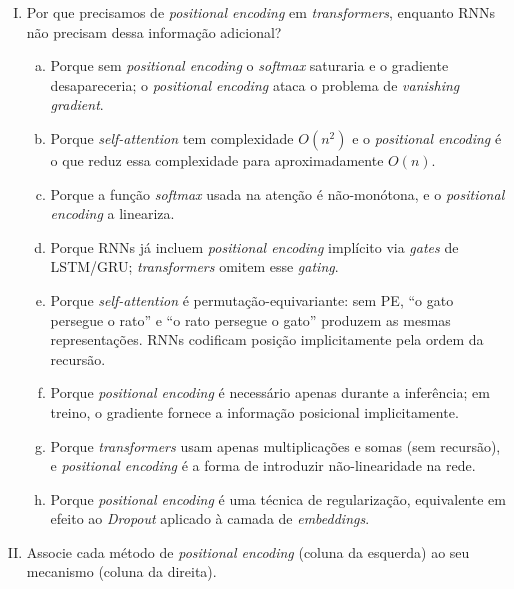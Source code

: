 \documentclass{dlproblemset}
\begin{document}
\begin{enumerate}[I)]
\item Por que precisamos de \textit{positional encoding} em \textit{transformers}, enquanto RNNs não precisam dessa informação adicional?

\begin{enumerate}[a)]
    \item Porque sem \textit{positional encoding} o \textit{softmax} saturaria e o gradiente desapareceria; o \textit{positional encoding} ataca o problema de \textit{vanishing gradient}.
    \item Porque \textit{self-attention} tem complexidade $O(n^2)$ e o \textit{positional encoding} é o que reduz essa complexidade para aproximadamente $O(n)$.
    \item Porque a função \textit{softmax} usada na atenção é não-monótona, e o \textit{positional encoding} a lineariza.
    \item Porque RNNs já incluem \textit{positional encoding} implícito via \textit{gates} de LSTM/GRU; \textit{transformers} omitem esse \textit{gating}.
    \item Porque \textit{self-attention} é permutação-equivariante: sem PE, ``o gato persegue o rato'' e ``o rato persegue o gato'' produzem as mesmas representações. RNNs codificam posição implicitamente pela ordem da recursão.
    \item Porque \textit{positional encoding} é necessário apenas durante a inferência; em treino, o gradiente fornece a informação posicional implicitamente.
    \item Porque \textit{transformers} usam apenas multiplicações e somas (sem recursão), e \textit{positional encoding} é a forma de introduzir não-linearidade na rede.
    \item Porque \textit{positional encoding} é uma técnica de regularização, equivalente em efeito ao \textit{Dropout} aplicado à camada de \textit{embeddings}.
\end{enumerate}

\item Associe cada método de \textit{positional encoding} (coluna da esquerda) ao seu mecanismo (coluna da direita).


\end{enumerate}
\end{document}
